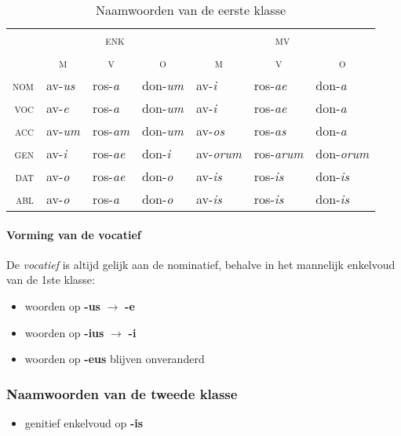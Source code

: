 \documentclass[12pt,a4paper]{article}
\begin{document}
\begin{table}[H]
\centering
\begin{tabular}{ r | l l l | l l l }
\toprule
 & \multicolumn{3}{c|}{\textsc{enk}} & \multicolumn{3}{c}{\textsc{mv}} \\
 & \multicolumn{1}{c}{\textsc{m}} & \multicolumn{1}{c}{\textsc{v}} & \multicolumn{1}{c|}{\textsc{o}} & \multicolumn{1}{c}{\textsc{m}} & \multicolumn{1}{c}{\textsc{v}} & \multicolumn{1}{c}{\textsc{o}} \\ 
\midrule
\textsc{nom} & av-\emph{us} & ros-\emph{a}  & don-\emph{um} & av-\emph{i}    & ros-\emph{ae}   & don-\emph{a} \\
\textsc{voc} & av-\emph{e}  & ros-\emph{a}  & don-\emph{um} & av-\emph{i}    & ros-\emph{ae}   & don-\emph{a} \\
\textsc{acc} & av-\emph{um} & ros-\emph{am} & don-\emph{um} & av-\emph{os}   & ros-\emph{as}   & don-\emph{a} \\
\textsc{gen} & av-\emph{i}  & ros-\emph{ae} & don-\emph{i}  & av-\emph{orum} & ros-\emph{arum} & don-\emph{orum} \\
\textsc{dat} & av-\emph{o}  & ros-\emph{ae} & don-\emph{o}  & av-\emph{is}   & ros-\emph{is}   & don-\emph{is} \\
\textsc{abl} & av-\emph{o}  & ros-\emph{a} & don-\emph{o} & av-\emph{is} & ros-\emph{is} & don-\emph{is} \\
\bottomrule
\end{tabular}
\caption{Naamwoorden van de eerste klasse}
\label{tab:nw1}
\end{table}

\paragraph{Vorming van de vocatief} De \emph{vocatief} is altijd gelijk aan de nominatief, behalve in het mannelijk enkelvoud van de 1ste klasse:
\begin{itemize}
    \item woorden op \textbf{-us}  $\rightarrow$ \textbf{-e}
    \item woorden op \textbf{-ius} $\rightarrow$ \textbf{-i}
    \item woorden op \textbf{-eus} blijven onveranderd
\end{itemize}


\subsubsection{Naamwoorden van de tweede klasse}
\begin{itemize}
    \item genitief enkelvoud op \textbf{-is}
\end{itemize}
\end{document}

